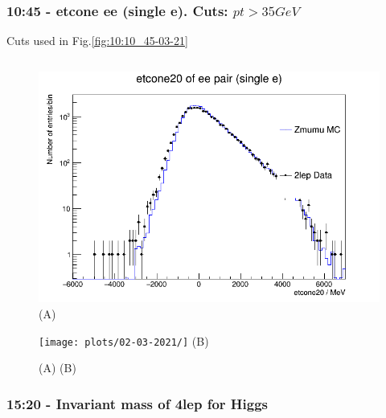 \subsubsection*{10:45 - etcone ee (single e). Cuts: $pt > 35 GeV$}
Cuts used in Fig.\ref{fig:10:10_45-03-21}
\begin{lstlisting}

\end{lstlisting}
\begin{figure}[h!]
    \centering
    \begin{minipage}{0.5\textwidth}
        \centering
        \includegraphics[width=\linewidth]{plots/02-03-2021/10-50_2Stack.png}
        (A)
    \end{minipage}\hfill
    \begin{minipage}{0.5\textwidth}
        \centering
        \texttt{[image: plots/02-03-2021/]}
        (B)
    \end{minipage}
    \caption{(A)  (B)}
    \label{}
\end{figure}

\subsubsection*{15:20 - Invariant mass of 4lep for Higgs}


